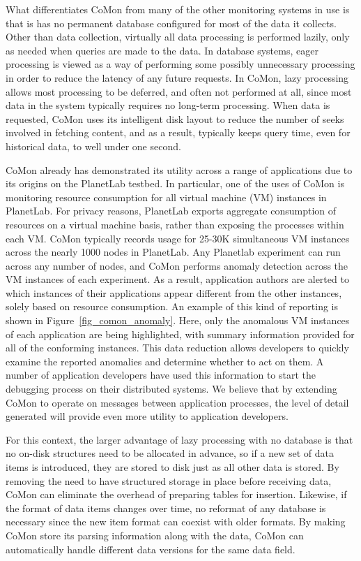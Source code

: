 
What differentiates CoMon from many of the other monitoring systems in
use is that is has no permanent database configured for most of the
data it collects. Other than data collection, virtually all data
processing is performed lazily, only as needed when queries are made
to the data. In database systems, eager processing is viewed as a way
of performing some possibly unnecessary processing in order to reduce
the latency of any future requests. In CoMon, lazy processing allows
most processing to be deferred, and often not performed at all, since
most data in the system typically requires no long-term processing.
When data is requested, CoMon uses its intelligent disk layout to
reduce the number of seeks involved in fetching content, and as a
result, typically keeps query time, even for historical data, to well
under one second.

CoMon already has demonstrated its utility across a range of
applications due to its origins on the PlanetLab testbed. In
particular, one of the uses of CoMon is monitoring resource
consumption for all virtual machine (VM) instances in PlanetLab. For
privacy reasons, PlanetLab exports aggregate consumption of resources
on a virtual machine basis, rather than exposing the processes within
each VM. CoMon typically records usage for 25-30K simultaneous VM
instances across the nearly 1000 nodes in PlanetLab. Any Planetlab
experiment can run across any number of nodes, and CoMon performs
anomaly detection across the VM instances of each experiment. As a
result, application authors are alerted to which instances of their
applications appear different from the other instances, solely based
on resource consumption. An example of this kind of reporting is shown
in Figure~\ref{fig_comon_anomaly}. Here, only the anomalous VM
instances of each application are being highlighted, with summary
information provided for all of the conforming instances. This data
reduction allows developers to quickly examine the reported anomalies
and determine whether to act on them. A number of application
developers have used this information to start the debugging process
on their distributed systems. We believe that by extending CoMon to
operate on messages between application processes, the level of detail
generated will provide even more utility to application developers.

For this context, the larger advantage of lazy processing with no
database is that no on-disk structures need to be allocated in
advance, so if a new set of data items is introduced, they are stored
to disk just as all other data is stored. By removing the need to have
structured storage in place before receiving data, CoMon can eliminate
the overhead of preparing tables for insertion. Likewise, if the
format of data items changes over time, no reformat of any database is
necessary since the new item format can coexist with older formats. By
making CoMon store its parsing information along with the data, CoMon
can automatically handle different data versions for the same data
field.

